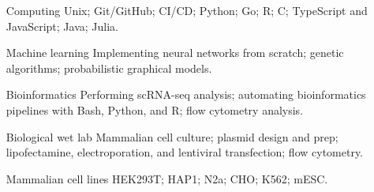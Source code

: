 \documentclass{article}
\begin{document}
\begin{itemize}[leftmargin=1.5in]
    \item[Computing] Unix; Git/GitHub; CI/CD; Python; Go; R; C; TypeScript and JavaScript; Java; Julia.
    \item[Machine learning] Implementing neural networks from scratch; genetic algorithms; probabilistic graphical models.
    \item[Bioinformatics] Performing scRNA-seq analysis; automating bioinformatics pipelines with Bash, Python, and R; flow cytometry analysis.
    \item[Biological wet lab] Mammalian cell culture; plasmid design and prep; lipofectamine, electroporation, and lentiviral transfection; flow cytometry.
    \item[Mammalian cell lines] HEK293T; HAP1; N2a; CHO; K562; mESC.
\end{itemize}
\end{document}
